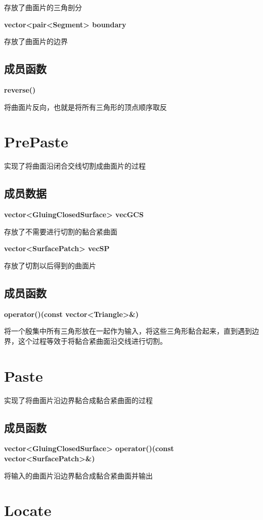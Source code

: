 \documentclass[UTF8]{ctexart}
\begin{document}
	存放了曲面片的三角剖分
	
	\textbf{vector<pair<Segment> boundary}
	
	存放了曲面片的边界
	
	\subsection{成员函数}
	\textbf{reverse()}
	
	将曲面片反向，也就是将所有三角形的顶点顺序取反
	
	
	\section{PrePaste}
	实现了将曲面沿闭合交线切割成曲面片的过程
	
	
	\subsection{成员数据}
	\textbf{vector<GluingClosedSurface> vecGCS}
	
	存放了不需要进行切割的黏合紧曲面
	
	\textbf{vector<SurfacePatch> vecSP}
	
	存放了切割以后得到的曲面片
	
	\subsection{成员函数}
	\textbf{operator()(const vector<Triangle>\&)}
	
	将一个殷集中所有三角形放在一起作为输入，将这些三角形黏合起来，直到遇到边界，这个过程等效于将黏合紧曲面沿交线进行切割。
	
	
		\section{Paste}
	实现了将曲面片沿边界黏合成黏合紧曲面的过程
	
	
	
	\subsection{成员函数}
	\textbf{vector<GluingClosedSurface> operator()(const vector<SurfacePatch>\&)}
	
	将输入的曲面片沿边界黏合成黏合紧曲面并输出
	
	\section{Locate}
	
\end{document}
